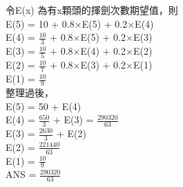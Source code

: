 \documentclass{article}
\begin{document}
\fontsize{15pt}{20pt}\selectfont

\begin{CJK}{UTF8}{bsmi} %
\noindent
令E(x) 為有x顆頭的揮劍次數期望值，則\\
E(5) = 10 + 0.8$\times$E(5) + 0.2$\times$E(4)\\
E(4) = $\frac{10}{3}$ + 0.8$\times$E(5) + 0.2$\times$E(3)\\
E(3) = $\frac{10}{5}$ + 0.8$\times$E(4) + 0.2$\times$E(2)\\
E(2) = $\frac{10}{7}$ + 0.8$\times$E(3) + 0.2$\times$E(1)\\
E(1) = $\frac{10}{9}$\\

整理過後，\\
E(5) = 50 + E(4)\\
E(4) = $\frac{650}{3}$ + E(3) = $\frac{290320}{63}$\\
E(3) = $\frac{2630}{3}$ + E(2)\\
E(2) = $\frac{221440}{63}$\\
E(1) = $\frac{10}{9}$\\

ANS = $\frac{290320}{63}$
\end{CJK} %
\end{document}
